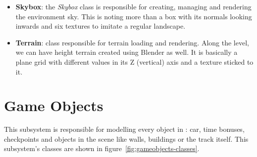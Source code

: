 \begin{itemize}
	\item \textbf{Skybox}: the \textit{Skybox} class is responsible for creating, managing and rendering the
	environment sky. This is noting more than a box with its normals looking inwards and six textures to imitate
	a regular landscape.
	
	\item \textbf{Terrain}: class responsible for terrain loading and rendering. Along the level, we can have
	height terrain created using Blender as well. It is basically a plane grid with different values in its
	Z (vertical) axis and a texture sticked to it.
\end{itemize}

\section{Game Objects}

This subsystem is responsible for modelling every object in \game: car, time bonuses, checkpoints and objects
in the scene like walls, buildings or the track itself. This subsystem's classes are shown in
figure~\ref{fig:gameobjects-classes}.


